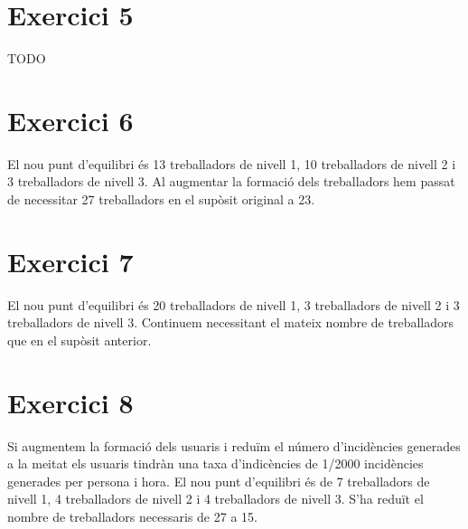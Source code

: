 \documentclass[11pt,a4paper,twoside]{report}
\begin{document}
\section{Exercici 5}
TODO

\section{Exercici 6}
El nou punt d'equilibri és 13 treballadors de nivell 1, 10 treballadors de nivell 2 i 3 treballadors de nivell 3.
\newline Al augmentar la formació dels treballadors hem passat de necessitar 27 treballadors en el supòsit original a 23.

\section{Exercici 7}
El nou punt d'equilibri és 20 treballadors de nivell 1, 3 treballadors de nivell 2 i 3 treballadors de nivell 3.
\newline Continuem necessitant el mateix nombre de treballadors que en el supòsit anterior.

\section{Exercici 8}
Si augmentem la formació dels usuaris i reduïm el número d'incidències generades a la meitat els usuaris tindràn una taxa d'indicències de 1/2000 incidències generades per persona i hora.
\newline El nou punt d'equilibri és de 7 treballadors de nivell 1, 4 treballadors de nivell 2 i 4 treballadors de nivell 3.
S'ha reduït el nombre de treballadors necessaris de 27 a 15.
\end{document}
